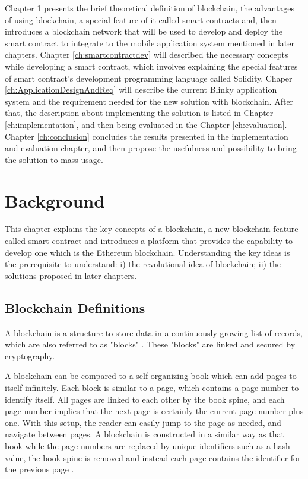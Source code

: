 \documentclass[twoside,numperchapter]{tutthesis} %
\begin{document}
Chapter \ref{ch:background} presents the brief theoretical definition of blockchain, the advantages of using blockchain, a special feature of it called smart contracts and, then introduces a blockchain network that will be used to develop and deploy the smart contract to integrate to the mobile application system mentioned in later chapters. Chapter \ref{ch:smartcontractdev} will described the necessary concepts while developing a smart contract, which involves explaining the special features of smart contract's development programming language called Solidity. Chaper \ref{ch:ApplicationDesignAndReq} will describe the current Blinky application system and the requirement needed for the new solution with blockchain. After that, the description about implementing the solution is listed in Chapter \ref{ch:implementation}, and then being evaluated in the Chapter \ref{ch:evaluation}. Chapter \ref{ch:conclusion} concludes the results presented in the implementation and evaluation chapter, and then propose the usefulness and possibility to bring the solution to mass-usage.



\chapter{Background}
\label{ch:background}

This chapter explains the key concepts of a blockchain, a new blockchain feature called smart contract and introduces a platform that provides the capability to develop one which is the Ethereum blockchain. Understanding the key ideas is the prerequisite to understand: i) the revolutional idea of blockchain; ii) the solutions proposed in later chapters.

\section{Blockchain Definitions}

A blockchain is a structure to store data in a continuously growing list of records, which are also referred to as "blocks" \citep{RefWorks:doc:WhatIsBlockChain}. These "blocks" are linked and secured by cryptography.

A blockchain can be compared to a self-organizing book which can add pages to itself infinitely. Each block is similar to a page, which contains a page number to identify itself. All pages are linked to each other by the book spine, and each page number implies that the next page is certainly the current page number plus one. With this setup, the reader can easily jump to the page as needed, and navigate between pages. A blockchain is constructed in a similar way as that book while the page numbers are replaced by unique identifiers such as a hash value, the book spine is removed and instead each page contains the identifier for the previous page \citep{RefWorks:doc:BlockchainBasicsBook}.
\end{document}

